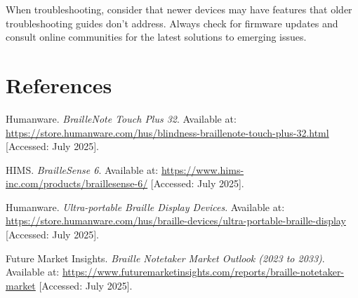 \begin{raggedright}
When troubleshooting, consider that newer devices may have features that older troubleshooting guides don't address. Always check for firmware updates and consult online communities for the latest solutions to emerging issues.
\end{raggedright}

\section{References}
\begin{thebibliography}{99}

 Humanware. \textit{BrailleNote Touch Plus 32}. Available at: \url{https://store.humanware.com/hus/blindness-braillenote-touch-plus-32.html} [Accessed: July 2025].

 HIMS. \textit{BrailleSense 6}. Available at: \url{https://www.hims-inc.com/products/braillesense-6/} [Accessed: July 2025].

 Humanware. \textit{Ultra-portable Braille Display Devices}. Available at: \url{https://store.humanware.com/hus/braille-devices/ultra-portable-braille-display} [Accessed: July 2025].

 Future Market Insights. \textit{Braille Notetaker Market Outlook (2023 to 2033)}. Available at: \url{https://www.futuremarketinsights.com/reports/braille-notetaker-market} [Accessed: July 2025].

\end{thebibliography}

